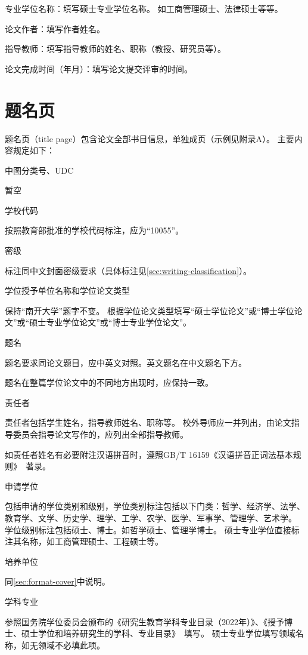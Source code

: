 {\heiti 专业学位名称：}填写硕士专业学位名称。
如工商管理硕士、法律硕士等等。

{\heiti 论文作者：}填写作者姓名。

{\heiti 指导教师：}填写指导教师的姓名、职称（教授、研究员等）。

{\heiti 论文完成时间（年月）：}填写论文提交评审的时间。

\section{题名页}

题名页（title page）包含论文全部书目信息，单独成页（示例见附录A）。
主要内容规定如下：

{\heiti 中图分类号、UDC}

暂空

{\heiti 学校代码}

按照教育部批准的学校代码标注，应为“10055”。

{\heiti 密级}

标注同中文封面密级要求（具体标注见\ref{sec:writing-classification}）。

{\heiti 学位授予单位名称和学位论文类型}

保持“南开大学”题字不变。
根据学位论文类型填写“硕士学位论文”或“博士学位论文”或“硕士专业学位论文”或“博士专业学位论文”。

{\heiti 题名}

题名要求同论文题目，应中英文对照。英文题名在中文题名下方。

题名在整篇学位论文中的不同地方出现时，应保持一致。

{\heiti 责任者}

责任者包括学生姓名，指导教师姓名、职称等。
校外导师应一并列出，由论文指导委员会指导论文写作的，应列出全部指导教师。

如责任者姓名有必要附注汉语拼音时，遵照GB/T 16159《汉语拼音正词法基本规则》~\cite{SCSF00038519}著录。

{\heiti 申请学位}

包括申请的学位类别和级别，学位类别标注包括以下门类：哲学、经济学、法学、教育学、文学、历史学、理学、工学、农学、医学、军事学、管理学、艺术学。
学位级别标注包括硕士、博士。如哲学硕士、管理学博士。
硕士专业学位直接标注其名称，如工商管理硕士、工程硕士等。

{\heiti 培养单位}

同\ref{sec:format-cover}中说明。

{\heiti 学科专业}

参照国务院学位委员会颁布的《研究生教育学科专业目录（2022年）》、《授予博士、硕士学位和培养研究生的学科、专业目录》~\cite{REF00000002}填写。
硕士专业学位填写领域名称，如无领域不必填此项。

